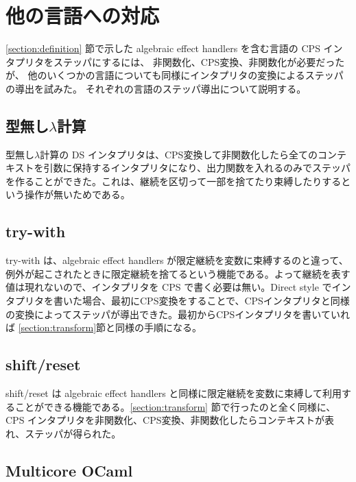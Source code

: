 \section{他の言語への対応}
\label{section:languages}

\ref{section:definition} 節で示した algebraic effect handlers
を含む言語の CPS インタプリタをステッパにするには、
非関数化、CPS変換、非関数化が必要だったが、
他のいくつかの言語についても同様にインタプリタの変換によるステッパの導出を試みた。
それぞれの言語のステッパ導出について説明する。


\subsection{型無し$\lambda$計算}
\label{subsection:lambda}

型無し$\lambda$計算の DS インタプリタは、CPS変換して非関数化したら全てのコンテキストを引数に保持するインタプリタになり、出力関数を入れるのみでステッパを作ることができた。これは、継続を区切って一部を捨てたり束縛したりするという操作が無いためである。


\subsection{try-with}
\label{subsection:try_with}

try-with は、algebraic effect handlers が限定継続を変数に束縛するのと違って、例外が起こされたときに限定継続を捨てるという機能である。よって継続を表す値は現れないので、インタプリタを CPS で書く必要は無い。Direct style でインタプリタを書いた場合、最初にCPS変換をすることで、CPSインタプリタと同様の変換によってステッパが導出できた。最初からCPSインタプリタを書いていれば \ref{section:transform}節と同様の手順になる。


\subsection{shift/reset}
\label{subsection:shift/reset}

shift/reset は algebraic effect handlers と同様に限定継続を変数に束縛して利用することができる機能である。\ref{section:transform} 節で行ったのと全く同様に、CPS インタプリタを非関数化、CPS変換、非関数化したらコンテキストが表れ、ステッパが得られた。


\subsection{Multicore OCaml}
\label{subsection:multicore_ocaml}

